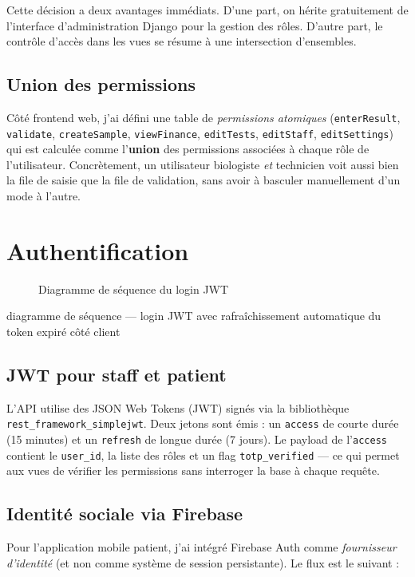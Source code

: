 \documentclass[12pt, a4paper, oneside]{report}
\newcommand{\placeholderFigure}[3][0.75]{%
  \begin{figure}[ht]
    \centering
    \fbox{\begin{minipage}[c][6.5cm][c]{#1\linewidth}
      \centering
      \textit{\small À insérer : #3}
    \end{minipage}}
    \caption{#2}
    \label{fig:#3}
  \end{figure}%
}
\begin{document}
Cette décision a deux avantages immédiats. D'une part, on hérite
gratuitement de l'interface d'administration Django pour la gestion
des rôles. D'autre part, le contrôle d'accès dans les vues se
résume à une intersection d'ensembles.

\subsection{Union des permissions}
Côté frontend web, j'ai défini une table de \emph{permissions atomiques}
(\texttt{enterResult}, \texttt{validate}, \texttt{createSample},
\texttt{viewFinance}, \texttt{editTests}, \texttt{editStaff},
\texttt{editSettings}) qui est calculée comme l'\textbf{union} des
permissions associées à chaque rôle de l'utilisateur. Concrètement, un
utilisateur biologiste \emph{et} technicien voit aussi bien la file de
saisie que la file de validation, sans avoir à basculer manuellement
d'un mode à l'autre.

\section{Authentification}

\placeholderFigure{Diagramme de séquence du login JWT}%
{seq-jwt}{diagramme de séquence — login JWT avec rafraîchissement
automatique du token expiré côté client}

\subsection{JWT pour staff et patient}
L'API utilise des JSON Web Tokens (JWT) signés via la bibliothèque
\texttt{rest\_framework\_simplejwt}. Deux jetons sont émis :
un \texttt{access} de courte durée (15 minutes) et un \texttt{refresh}
de longue durée (7 jours). Le payload de l'\texttt{access} contient
le \texttt{user\_id}, la liste des rôles et un flag
\texttt{totp\_verified} — ce qui permet aux vues de vérifier les
permissions sans interroger la base à chaque requête.

\subsection{Identité sociale via Firebase}
Pour l'application mobile patient, j'ai intégré Firebase Auth comme
\emph{fournisseur d'identité} (et non comme système de session
persistante). Le flux est le suivant :
\end{document}

